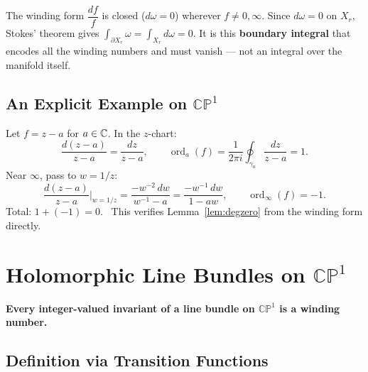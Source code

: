 \documentclass[11pt,openany]{article}
\renewcommand{\emph}[1]{\textbf{#1}}
\newenvironment{infobox}{%
  \def\FrameCommand{\fboxrule=0.8pt \fboxsep=8pt \colorbox{noteblue}}%
  \MakeFramed{\advance\hsize-\width \FrameRestore}}{\endMakeFramed}
\newcommand{\CP}{\mathbb{CP}}
\newcommand{\CPone}{\CP^1}
\newcommand{\ord}{\operatorname{ord}}
\begin{document}
\begin{infobox}
The winding form $\dfrac{df}{f}$ is closed ($d\omega=0$) wherever $f\neq 0,\infty$.
Since $d\omega=0$ on $X_r$, Stokes' theorem gives
$\displaystyle\int_{\partial X_r}\omega = \int_{X_r}d\omega = 0$.
It is this \textbf{boundary integral} that encodes all the winding numbers and must
vanish — not an integral over the manifold itself.
\end{infobox}

\medskip
\begin{center}

\end{center}

\subsection{An Explicit Example on $\CPone$}
\label{subsec:explicitCP1}

\begin{example}
{\color{blue}Let $f=z-a$ for $a\in\mathbb{C}$.}
In the $z$-chart:
\[
  \frac{d(z-a)}{z-a} = \frac{dz}{z-a},
  \qquad
  \ord_a(f) = \frac{1}{2\pi i}\oint_{\gamma_a}\frac{dz}{z-a} = 1.
\]
Near $\infty$, pass to $w=1/z$:
\[
  \frac{d(z-a)}{z-a}\bigg|_{w=1/z}
  = \frac{-w^{-2}\,dw}{w^{-1}-a}
  = \frac{-w^{-1}\,dw}{1-aw},
  \qquad
  \ord_\infty(f) = -1.
\]
Total: $1+(-1)=0$.\ \checkmark\quad
This verifies Lemma~\ref{lem:degzero} from the winding form directly.
\end{example}

\medskip
\begin{center}

\end{center}

\newpage
\section{Holomorphic Line Bundles on $\CPone$}
\label{sec:linebundles}

\medskip\noindent
\emph{Every integer-valued invariant of a line bundle on $\CPone$ is a winding number.}

\subsection{Definition via Transition Functions}
\label{subsec:transition}
\end{document}
